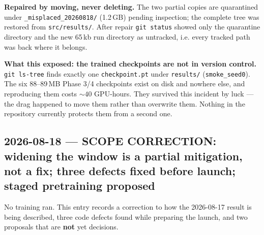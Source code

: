 \documentclass[11pt,a4paper]{article}
\newcommand{\code}[1]{\texttt{\small #1}}
\begin{document}
\begin{itemize}
\textbf{Repaired by moving, never deleting.} The two partial copies are
quarantined under \code{\_misplaced\_20260818/} (1.2\,GB) pending inspection;
the complete tree was restored from \code{src/results/}. After repair
\code{git status} showed only the quarantine directory and the new 65\,kb run
directory as untracked, i.e. every tracked path was back where it belongs.

\textbf{What this exposed: the trained checkpoints are not in version
control.} \code{git ls-tree} finds exactly one \code{checkpoint.pt} under
\code{results/} (\code{smoke\_seed0}). The six 88--89\,MB Phase 3/4 checkpoints
exist on disk and nowhere else, and reproducing them costs ${\sim}40$
GPU-hours. They survived this incident by luck --- the drag happened to move
them rather than overwrite them. Nothing in the repository currently protects
them from a second one.

\end{itemize}
\subsection*{2026-08-18 --- SCOPE CORRECTION: widening the window is a partial
mitigation, not a fix; three defects fixed before launch; staged pretraining
proposed}

No training ran. This entry records a correction to how the 2026-08-17 result
is being described, three code defects found while preparing the launch, and
two proposals that are \textbf{not} yet decisions.
\end{document}

